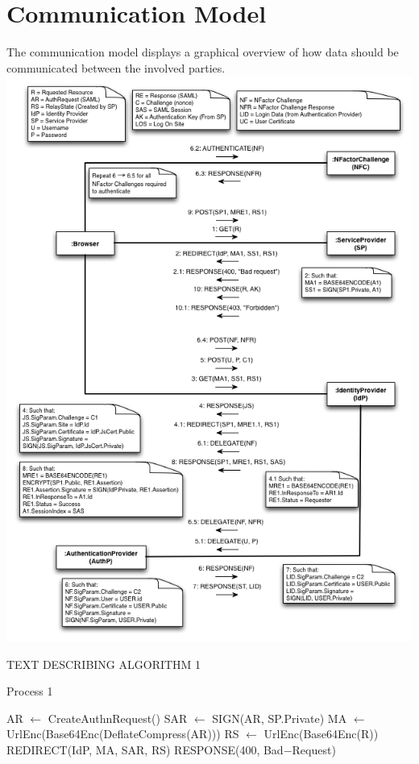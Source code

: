\documentclass[twosided]{report}
\begin{document}
\section{Communication Model}
The communication model displays a graphical overview of how data should be communicated between the involved parties.
\newpage
\includegraphics[scale=0.6]{images/Communication.png}

TEXT DESCRIBING ALGORITHM 1
\begin{algorithm}[H]
	\caption{Process 1}
	\begin{algorithmic}
		\STATE AR $\leftarrow$ CreateAuthnRequest()
		\STATE SAR $\leftarrow$ SIGN(AR, SP.Private)
		\STATE MA $\leftarrow$ UrlEnc(Base64Enc(DeflateCompress(AR)))
		\STATE RS $\leftarrow$ UrlEnc(Base64Enc(R))
		\RETURN REDIRECT(IdP, MA, SAR, RS)
	\ELSE
		\RETURN RESPONSE(400, Bad−Request)
	\ENDIF
	\end{algorithmic}
\end{algorithm}
\end{document}
